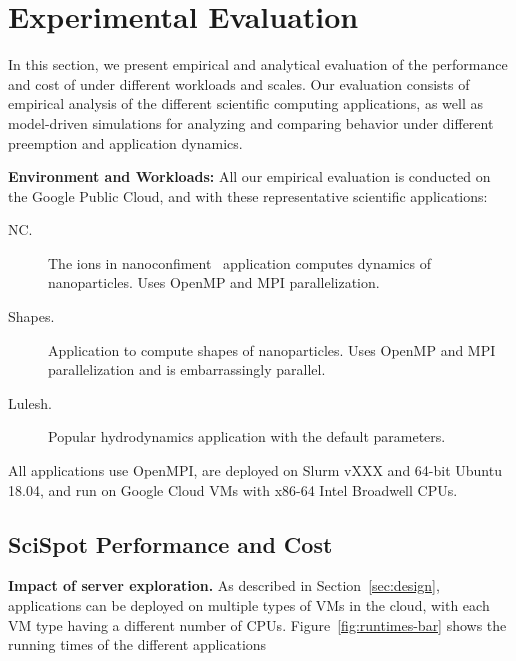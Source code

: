 \section{Experimental Evaluation}
\label{sec:eval}

In this section, we present empirical and analytical evaluation of the performance and cost of \sysname under different workloads and scales. 
Our evaluation consists of empirical analysis of the different scientific computing applications, as well as model-driven simulations for analyzing and comparing \sysname behavior under different preemption and application dynamics. 


\noindent \textbf{Environment and Workloads:} All our empirical evaluation is conducted on the Google Public Cloud, and with these representative scientific applications: 
\vspace*{\tightext}
\begin{description}
\item[NC.] The ions in nanoconfiment~\cite{} application computes dynamics of nanoparticles. Uses OpenMP and MPI parallelization. 
\item[Shapes.]  Application to compute shapes of nanoparticles. Uses OpenMP and MPI parallelization and is embarrassingly parallel. 
\item[Lulesh.] Popular hydrodynamics application with the default parameters. 
\end{description}
\vspace*{\tightext}
All applications use OpenMPI, are deployed on Slurm vXXX and 64-bit Ubuntu 18.04, and run on Google Cloud VMs with x86-64 Intel Broadwell CPUs. 


\subsection{SciSpot Performance and Cost}

\noindent \textbf{Impact of server exploration.}
As described in Section~\ref{sec:design}, applications can be deployed on multiple types of VMs in the cloud, with each VM type having a different number of CPUs. 
Figure~\ref{fig:runtimes-bar} shows the running times of the different applications 


